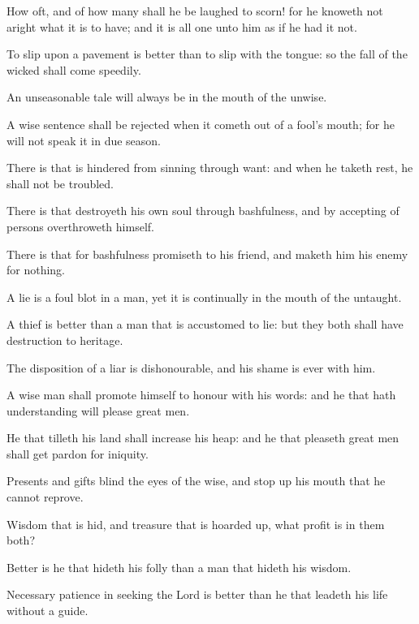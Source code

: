 {\par }{\PP {}How oft, and of how many shall he be laughed to scorn! for he knoweth not aright what it is to have; and it is all one unto him as if he had it not.
\par }{\PP {}To slip upon a pavement is better than to slip with the tongue: so the fall of the wicked shall come speedily.
\par }{\PP {}An unseasonable tale will always be in the mouth of the unwise.
\par }{\PP {}A wise sentence shall be rejected when it cometh out of a fool’s mouth; for he will not speak it in due season.
\par }{\PP {}There is that is hindered from sinning through want: and when he taketh rest, he shall not be troubled.
\par }{\PP {}There is that destroyeth his own soul through bashfulness, and by accepting of persons overthroweth himself.
\par }{\PP {}There is that for bashfulness promiseth to his friend, and maketh him his enemy for nothing.
\par }{\PP {}A lie is a foul blot in a man, yet it is continually in the mouth of the untaught.
\par }{\PP {}A thief is better than a man that is accustomed to lie: but they both shall have destruction to heritage.
\par }{\PP {}The disposition of a liar is dishonourable, and his shame is ever with him.
\par }{\PP {}A wise man shall promote himself to honour with his words: and he that hath understanding will please great men.
\par }{\PP {}He that tilleth his land shall increase his heap: and he that pleaseth great men shall get pardon for iniquity.
\par }{\PP {}Presents and gifts blind the eyes of the wise, and stop up his mouth that he cannot reprove.
\par }{\PP {}Wisdom that is hid, and treasure that is hoarded up, what profit is in them both?
\par }{\PP {}Better is he that hideth his folly than a man that hideth his wisdom.
\par }{\PP {}Necessary patience in seeking the Lord is better than he that leadeth his life without a guide.

}
